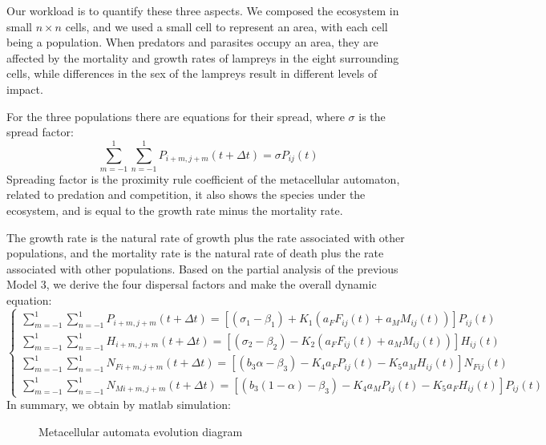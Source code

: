 \documentclass[12pt]{article}  %
\begin{document}
Our workload is to quantify these three aspects. We composed the ecosystem in small $n \times n$ cells, and we used a small cell to represent an area, with each cell being a population. When predators and parasites occupy an area, they are affected by the mortality and growth rates of lampreys in the eight surrounding cells, while differences in the sex of the lampreys result in different levels of impact.

For the three populations there are equations for their spread, where $\sigma$ is the spread factor:
\begin{equation}\label{eq:7-1}
\sum\limits_{m=-1}^{1}\sum\limits_{n=-1}^{1}P_{i+m,j+m}(t+\Delta t) = \sigma P_{ij}(t)
\end{equation}
Spreading factor is the proximity rule coefficient of the metacellular automaton, related to predation and competition, it also shows the species under the ecosystem, and is equal to the growth rate minus the mortality rate.

The growth rate is the natural rate of growth plus the rate associated with other populations, and the mortality rate is the natural rate of death plus the rate associated with other populations. Based on the partial analysis of the previous Model 3, we derive the four dispersal factors and make the overall dynamic equation:
\begin{equation}\label{eq:7-2}
\begin{cases}
	\sum\limits_{m=-1}^{1}\sum\limits_{n=-1}^{1}P_{i+m,j+m}(t+\Delta t) = [(\sigma_{1}-\beta_{1}) + K_{1}(a_{F}F_{ij}(t) + a_{M}M_{ij}(t))]P_{ij}(t)\\
	\sum\limits_{m=-1}^{1}\sum\limits_{n=-1}^{1}H_{i+m,j+m}(t+\Delta t) = [(\sigma_{2}-\beta_{2}) - K_{2}(a_{F}F_{ij}(t) + a_{M}M_{ij}(t))]H_{ij}(t) \\
	\sum\limits_{m=-1}^{1}\sum\limits_{n=-1}^{1}N_{Fi+m,j+m}(t+\Delta t) = [(b_{3}\alpha-\beta_{3}) - K_{4}a_{F}P_{ij}(t) - K_{5}a_{M}H_{ij}(t)]N_{Fij}(t) \\
	\sum\limits_{m=-1}^{1}\sum\limits_{n=-1}^{1}N_{Mi+m,j+m}(t+\Delta t) = [(b_{3}(1-\alpha)-\beta_{3}) - K_{4}a_{M}P_{ij}(t) - K_{5}a_{F}H_{ij}(t)]P_{ij}(t)
\end{cases}
\end{equation}
In summary, we obtain by matlab simulation:
\begin{figure}[htbp]
	\centering
	\quad
	\quad
	\quad
	\quad
	\caption{Metacellular automata evolution diagram} \label{fig:AM}
\end{figure}
\end{document}
